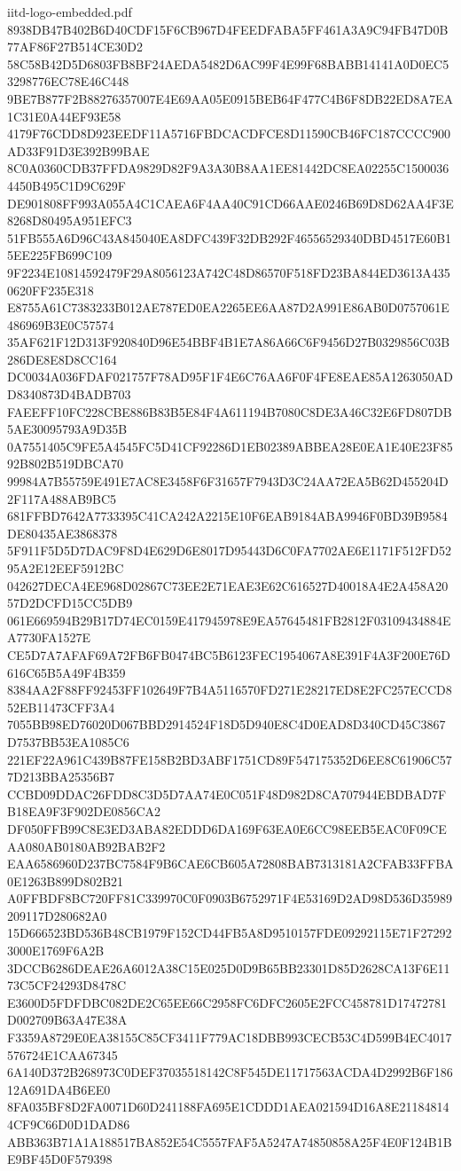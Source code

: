\begin{filecontents*}[overwrite]{iitd-logo-embedded.pdf}
8938DB47B402B6D40CDF15F6CB967D4FEEDFABA5FF461A3A9C94FB47D0B77AF86F27B514CE30D2
58C58B42D5D6803FB8BF24AEDA5482D6AC99F4E99F68BABB14141A0D0EC53298776EC78E46C448
9BE7B877F2B88276357007E4E69AA05E0915BEB64F477C4B6F8DB22ED8A7EA1C31E0A44EF93E58
4179F76CDD8D923EEDF11A5716FBDCACDFCE8D11590CB46FC187CCCC900AD33F91D3E392B99BAE
8C0A0360CDB37FFDA9829D82F9A3A30B8AA1EE81442DC8EA02255C15000364450B495C1D9C629F
DE901808FF993A055A4C1CAEA6F4AA40C91CD66AAE0246B69D8D62AA4F3E8268D80495A951EFC3
51FB555A6D96C43A845040EA8DFC439F32DB292F46556529340DBD4517E60B15EE225FB699C109
9F2234E10814592479F29A8056123A742C48D86570F518FD23BA844ED3613A4350620FF235E318
E8755A61C7383233B012AE787ED0EA2265EE6AA87D2A991E86AB0D0757061E486969B3E0C57574
35AF621F12D313F920840D96E54BBF4B1E7A86A66C6F9456D27B0329856C03B286DE8E8D8CC164
DC0034A036FDAF021757F78AD95F1F4E6C76AA6F0F4FE8EAE85A1263050ADD8340873D4BADB703
FAEEFF10FC228CBE886B83B5E84F4A611194B7080C8DE3A46C32E6FD807DB5AE30095793A9D35B
0A7551405C9FE5A4545FC5D41CF92286D1EB02389ABBEA28E0EA1E40E23F8592B802B519DBCA70
99984A7B55759E491E7AC8E3458F6F31657F7943D3C24AA72EA5B62D455204D2F117A488AB9BC5
681FFBD7642A7733395C41CA242A2215E10F6EAB9184ABA9946F0BD39B9584DE80435AE3868378
5F911F5D5D7DAC9F8D4E629D6E8017D95443D6C0FA7702AE6E1171F512FD5295A2E12EEF5912BC
042627DECA4EE968D02867C73EE2E71EAE3E62C616527D40018A4E2A458A2057D2DCFD15CC5DB9
061E669594B29B17D74EC0159E417945978E9EA57645481FB2812F03109434884EA7730FA1527E
CE5D7A7AFAF69A72FB6FB0474BC5B6123FEC1954067A8E391F4A3F200E76D616C65B5A49F4B359
8384AA2F88FF92453FF102649F7B4A5116570FD271E28217ED8E2FC257ECCD852EB11473CFF3A4
7055BB98ED76020D067BBD2914524F18D5D940E8C4D0EAD8D340CD45C3867D7537BB53EA1085C6
221EF22A961C439B87FE158B2BD3ABF1751CD89F547175352D6EE8C61906C577D213BBA25356B7
CCBD09DDAC26FDD8C3D5D7AA74E0C051F48D982D8CA707944EBDBAD7FB18EA9F3F902DE0856CA2
DF050FFB99C8E3ED3ABA82EDDD6DA169F63EA0E6CC98EEB5EAC0F09CEAA080AB0180AB92BAB2F2
EAA6586960D237BC7584F9B6CAE6CB605A72808BAB7313181A2CFAB33FFBA0E1263B899D802B21
A0FFBDF8BC720FF81C339970C0F0903B6752971F4E53169D2AD98D536D35989209117D280682A0
15D666523BD536B48CB1979F152CD44FB5A8D9510157FDE09292115E71F272923000E1769F6A2B
3DCCB6286DEAE26A6012A38C15E025D0D9B65BB23301D85D2628CA13F6E1173C5CF24293D8478C
E3600D5FDFDBC082DE2C65EE66C2958FC6DFC2605E2FCC458781D17472781D002709B63A47E38A
F3359A8729E0EA38155C85CF3411F779AC18DBB993CECB53C4D599B4EC4017576724E1CAA67345
6A140D372B268973C0DEF37035518142C8F545DE11717563ACDA4D2992B6F18612A691DA4B6EE0
8FA035BF8D2FA0071D60D241188FA695E1CDDD1AEA021594D16A8E211848144CF9C66D0D1DAD86
ABB363B71A1A188517BA852E54C5557FAF5A5247A74850858A25F4E0F124B1BE9BF45D0F579398

\end{filecontents*}

